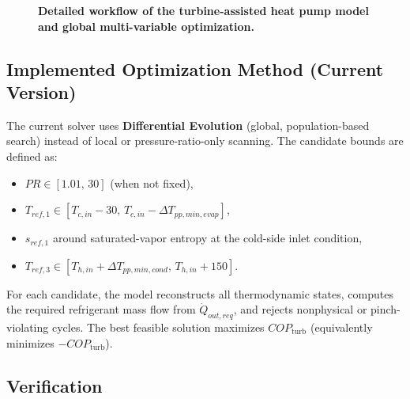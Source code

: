 \begin{figure}[h!]
\caption{\textbf{Detailed workflow of the turbine-assisted heat pump model and global multi-variable optimization.}}
\end{figure}

\subsection{Implemented Optimization Method (Current Version)}

The current solver uses \textbf{Differential Evolution} (global, population-based search) instead of local or pressure-ratio-only scanning. The candidate bounds are defined as:
\begin{itemize}
\item $PR \in [1.01,\,30]$ (when not fixed),
\item $T_{ref,1} \in [T_{c,in}-30,\,T_{c,in}-\Delta T_{pp,min,evap}]$,
\item $s_{ref,1}$ around saturated-vapor entropy at the cold-side inlet condition,
\item $T_{ref,3} \in [T_{h,in}+\Delta T_{pp,min,cond},\,T_{h,in}+150]$.
\end{itemize}

For each candidate, the model reconstructs all thermodynamic states, computes the required refrigerant mass flow from $\dot Q_{out,req}$, and rejects nonphysical or pinch-violating cycles. The best feasible solution maximizes $COP_{\mathrm{turb}}$ (equivalently minimizes $-COP_{\mathrm{turb}}$).

\subsection{Verification}

